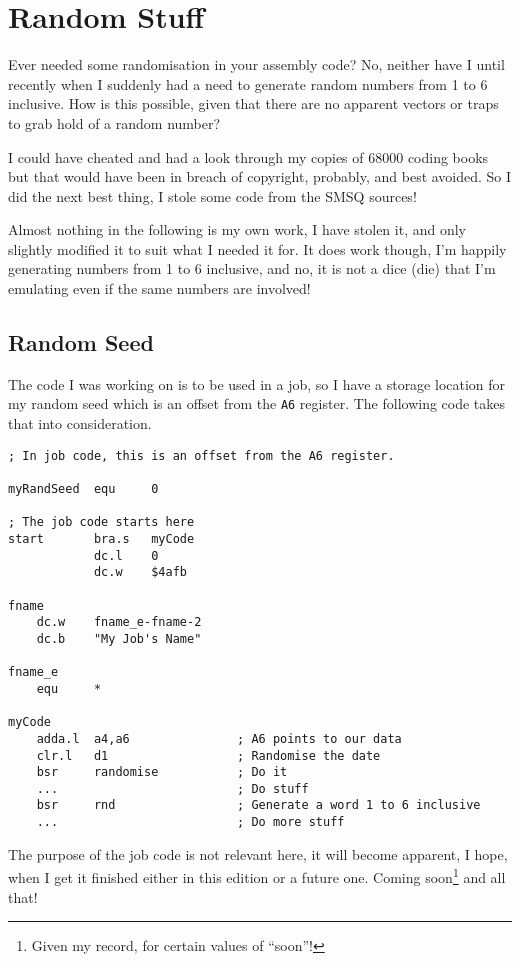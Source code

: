 \chapter{Random Stuff}

Ever needed some randomisation in your assembly code? No, neither
have I until recently when I suddenly had a need to generate random
numbers from 1 to 6 inclusive. How is this possible, given that there
are no apparent vectors or traps to grab hold of a random number?

I could have cheated and had a look through my copies of 68000 coding
books \textendash{} but that would have been in breach of copyright,
probably, and best avoided. So I did the next best thing, I stole
some code from the SMSQ sources!

Almost nothing in the following is my own work, I have stolen it,
and only slightly modified it to suit what I needed it for. It does
work though, I'm happily generating numbers from 1 to 6 inclusive,
and no, it is not a dice (die) that I'm emulating even if the same
numbers are involved!

\section{Random Seed}

The code I was working on is to be used in a job, so I have a storage
location for my random seed which is an offset from the \lstinline!A6!
register. The following code takes that into consideration.

\begin{lstlisting}[caption={The random seed},firstnumber=1]
; In job code, this is an offset from the A6 register.

myRandSeed  equ     0

; The job code starts here
start       bra.s   myCode
            dc.l    0
            dc.w    $4afb

fname
    dc.w    fname_e-fname-2
    dc.b    "My Job's Name"

fname_e
    equ     *

myCode
    adda.l  a4,a6               ; A6 points to our data
    clr.l   d1                  ; Randomise the date
    bsr     randomise           ; Do it
    ...                         ; Do stuff
    bsr     rnd                 ; Generate a word 1 to 6 inclusive
    ...                         ; Do more stuff
\end{lstlisting}

The purpose of the job code is not relevant here, it will become apparent,
I hope, when I get it finished \textendash{} either in this edition
or a future one. Coming soon\footnote{Given my record, for certain values of ``soon''!}
and all that!

